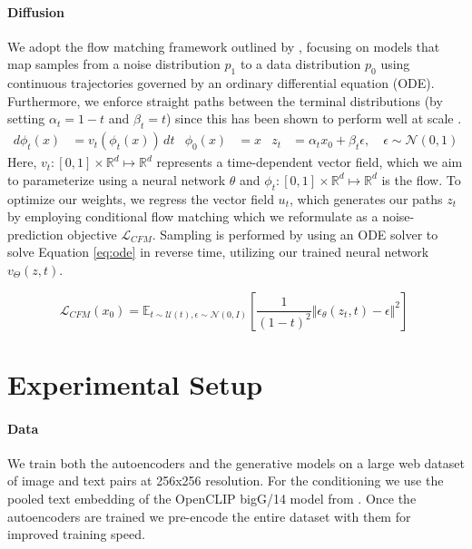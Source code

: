 \paragraph{Diffusion}
We adopt the flow matching framework outlined by \cite{lipman2023flow}, focusing on models that map samples from a noise distribution \( p_1 \) to a data distribution \( p_0 \) using continuous trajectories governed by an ordinary differential equation (ODE). Furthermore, we enforce straight paths between the terminal distributions (by setting \( \alpha_t = 1 - t \) and \( \beta_t = t \))  since this has been shown to perform well at scale \citep{esser2024scaling}.
\vspace{-2pt}
\begin{align}
\label{eq:ode}
d\phi_t(x) &= v_t(\phi_t(x)) \, dt & \phi_0(x) &= x & z_t &= \alpha_t x_0 + \beta_t \epsilon, \quad \epsilon \sim \mathcal{N}(0, 1)
\end{align}
\vspace{-2pt}
Here, \( v_t : [0, 1] \times \mathbb{R}^d \mapsto \mathbb{R}^d \) represents a time-dependent vector field, which we aim to parameterize using a neural network \( \theta \) and $\phi_t : [0, 1] \times \mathbb{R}^d \mapsto \mathbb{R}^d$ is the flow. To optimize our weights, we regress the vector field \( u_t \), which generates our paths \( z_t \) by employing conditional flow matching which we reformulate as a noise-prediction objective $\mathcal{L}_{CFM}$. Sampling is performed by using an ODE solver to solve Equation \ref{eq:ode} in reverse time, utilizing our trained neural network \( v_{\Theta}(z, t) \).

\begin{equation*}
  \mathcal{L}_{CFM}(x_0) = \mathbb{E}_{t \sim \mathcal{U}(t), \epsilon \sim \mathcal{N}(0, I)}
  \left[ \frac{1}{(1-t)^2} \Vert \epsilon_\theta(z_t, t) - \epsilon \Vert^2 \right]\;
\end{equation*}\section{Experimental Setup}
\label{sec:experimentalsetup}

\paragraph{Data}
We train both the autoencoders and the generative models on a large web dataset of image and text pairs at 256x256 resolution. For the conditioning we use the pooled text embedding of the OpenCLIP bigG/14 model from \cite{cherti2022reproducible}. Once the autoencoders are trained we pre-encode the entire dataset with them for improved training speed.

